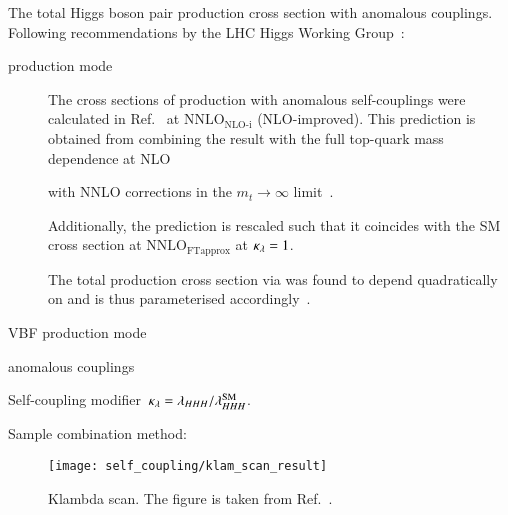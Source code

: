 The total Higgs boson pair production cross section with anomalous
couplings. Following recommendations by the LHC Higgs Working
Group~\cite{LHCHWGHH}:
\begin{description}

\item[\ggF production mode] The cross sections of \HH production with
  anomalous self-couplings were calculated in
  Ref.~\cite{Amoroso:2020lgh} at $\text{NNLO}_{\text{NLO-i}}$
  (NLO-improved). This prediction is obtained from combining the
  result with the full top-quark mass dependence at
  NLO~\cite{Buchalla:2018yce}


  with NNLO corrections in the $m_{t} \to \infty$
  limit~\cite{deFlorian:2017qfk}.

  Additionally, the prediction is rescaled such that it coincides with
  the SM \HH cross section at $\text{NNLO}_{\text{FTapprox}}$ at
  $\kappa_{\lambda} = 1$.

  The total \HH production cross section via \ggF was found to depend
  quadratically on \klambda and is thus parameterised
  accordingly~\cite{LHCHWGHH}.

\item[VBF production mode]

\end{description}


anomalous couplings

Self-coupling modifier~$\kappa_{\lambda} = \lambda_{HHH} / \lambda_{HHH}^{\text{SM}}$.


Sample combination method:~\cite{ATL-PHYS-PUB-2019-007}






\begin{figure}[htbp]
  \centering

  \texttt{[image: self\_coupling/klam\_scan\_result]}

  \caption{Klambda scan. The figure is taken from
    Ref.~\cite{ATLAS-CONF-2021-052}.}%
  \label{fig:klambda_scan}
\end{figure}




